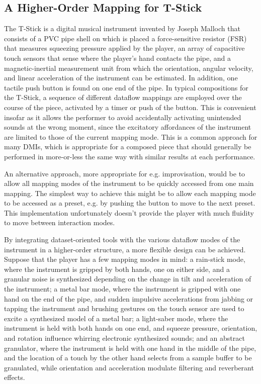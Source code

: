 \documentclass[main.tex]{subfiles}
\begin{document}
\subsection{A Higher-Order Mapping for T-Stick}

The T-Stick is a digital musical instrument invented by Joseph Malloch
\cite{Malloch2008} that consists of a PVC pipe shell on which is placed a
force-sensitive resistor (FSR) that measures squeezing pressure applied by the
player, an array of capacitive touch sensors that sense where the player's hand
contacts the pipe, and a magnetic-inertial measurement unit from which the
orientation, angular velocity, and linear acceleration of the instrument can be
estimated. In addition, one tactile push button is found on one end of the
pipe. In typical compositions for the T-Stick, a sequence of different dataflow mappings
are employed over the course of the piece, activated by a timer or push of the
button. This is convenient insofar as it allows the performer to avoid
accidentally activating unintended sounds at the wrong moment, since the
excitatory affordances of the instrument are limited to those of the current
mapping mode. This is a common approach for many DMIs, which is appropriate for
a composed piece that should generally be performed in more-or-less the same
way with similar results at each performance.

An alternative approach, more appropriate for e.g. improvisation, would be to
allow all mapping modes of the instrument to be quickly accessed from one main
mapping. The simplest way to achieve this might be to allow each mapping mode
to be accessed as a preset, e.g. by pushing the button to move to the next
preset. This implementation unfortunately doesn't provide the player with much
fluidity to move between interaction modes.

By integrating dataset-oriented tools with the various dataflow modes of the
instrument in a higher-order structure, a more flexible design can be achieved.
Suppose that the player has a few mapping modes in mind: a rain-stick mode,
where the instrument is gripped by both hands, one on either side, and a
granular noise is synthesized depending on the change in tilt and acceleration
of the instrument; a metal bar mode, where the instrument is gripped with one
hand on the end of the pipe, and sudden impulsive accelerations from jabbing or
tapping the instrument and brushing gestures on the touch sensor are used to
excite a synthesized model of a metal bar; a light-saber mode, where the
instrument is held with both hands on one end, and squeeze pressure,
orientation, and rotation influence whirring electronic synthesized sounds; and
an abstract granulator, where the instrument is held with one hand in the
middle of the pipe, and the location of a touch by the other hand selects
from a sample buffer to be granulated, while orientation and acceleration
modulate filtering and reverberant effects.
\end{document}
